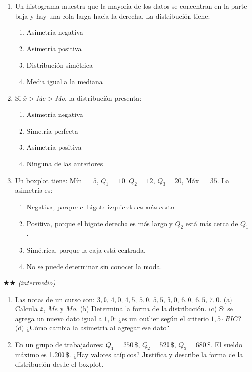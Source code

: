 \documentclass[11pt, letterpaper]{article}
\begin{document}
\begin{enumerate}[label=\textbf{\arabic*.}, leftmargin=*]
  \item Un histograma muestra que la mayoría de los datos se concentran en la parte baja y hay una cola larga hacia la derecha. La distribución tiene:
  \begin{enumerate}[label=\Alph*),leftmargin=14pt]
    \item Asimetría negativa
    \item Asimetría positiva
    \item Distribución simétrica
    \item Media igual a la mediana
  \end{enumerate}

  \item Si $\bar{x} > Me > Mo$, la distribución presenta:
  \begin{enumerate}[label=\Alph*),leftmargin=14pt]
    \item Asimetría negativa
    \item Simetría perfecta
    \item Asimetría positiva
    \item Ninguna de las anteriores
  \end{enumerate}

  \item Un boxplot tiene: Mín $= 5$, $Q_1 = 10$, $Q_2 = 12$, $Q_3 = 20$, Máx $= 35$. La asimetría es:
  \begin{enumerate}[label=\Alph*),leftmargin=14pt]
    \item Negativa, porque el bigote izquierdo es más corto.
    \item Positiva, porque el bigote derecho es más largo y $Q_2$ está más cerca de $Q_1$.
    \item Simétrica, porque la caja está centrada.
    \item No se puede determinar sin conocer la moda.
  \end{enumerate}
\end{enumerate}

$\bigstar\bigstar$ \textit{(intermedio)}

\begin{enumerate}[label=\textbf{\arabic*.}, leftmargin=*, resume]
  \item Las notas de un curso son: $3{,}0$, $4{,}0$, $4{,}5$, $5{,}0$, $5{,}5$, $6{,}0$, $6{,}0$, $6{,}5$, $7{,}0$.
  (a) Calcula $\bar{x}$, $Me$ y $Mo$.
  (b) Determina la forma de la distribución.
  (c) Si se agrega un nuevo dato igual a $1{,}0$: ¿es un outlier según el criterio $1{,}5 \cdot RIC$?
  (d) ¿Cómo cambia la asimetría al agregar ese dato?

  \item En un grupo de trabajadores: $Q_1 = 350\,\$$, $Q_2 = 520\,\$$, $Q_3 = 680\,\$$. El sueldo máximo es 1.200\,\$. ¿Hay valores atípicos? Justifica y describe la forma de la distribución desde el boxplot.
\end{enumerate}
\end{document}
